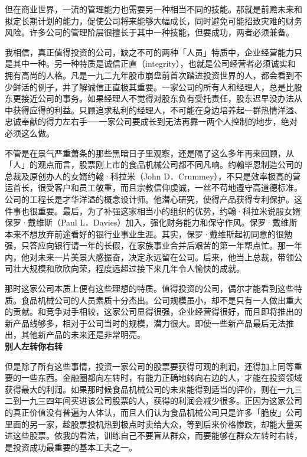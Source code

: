 \documentclass[UTF8,a4paper,zihao=-4,fontset = windows]{ctexart} %
\begin{document}
但在商业世界，一流的管理能力也需要另一种相当不同的技能。那就是前赡未来和拟定长期计划的能力，促使公司将来能够大幅成长，同时避免可能招致灾难的财务风险。许多公司的管理阶层很擅长于其中一种技能，但要成功，两者必须兼备。

我相信，真正值得投资的公司，缺之不可的两种「人员」特质中，企业经营能力只是其中一种。另一种特质是诚信正直（integrity），也就是公司经营者必须诚实和拥有高尚的人格。凡是一九二九年股市崩盘前首次踏进投资世界的人，都会看到不少鲜活的例子，并了解诚信正直极其重要。一家公司的所有人和经理人，总是比股东更接近公司的事务。如果经理人不觉得对股东负有受托责任，股东迟早没办法从中获得应得的利益。只顾追求私利的经理人，不可能在身边培养起一群热情洋溢、忠诚奉献的得力左右手──一家公司要成长到无法再靠一两个人控制的地步，绝对必须这么做。

不管是在景气严重萧条的那些黑暗日子里观察，还是隔了这么多年再来回顾，从「人」的观点而言，股票刚上市的食品机械公司都不同凡响。约翰毕恩制造公司的总裁及原创办人的女婿约翰·科拉米（John D．Crummey），不只是效率极高的营运首长，很受客户和员工敬重，而且宗教信仰虔诚，一丝不苟地遵守高道德标准。公司的工程长是才华洋溢的概念设计师。他潜心研究，使得产品获得专利保护。这件事也很重要。最后，为了补强这家相当小的组织的优势，约翰·科拉米说服女婿保罗·戴维斯（Paul L．Davies）加入，强化财务能力和保守作风。保罗·戴维斯本来不想放弃前途看好的银行业事业生涯。其实，保罗·戴维斯起初同意的很勉强，只答应向银行请一年的长假，在家族事业合并后艰苦的第一年帮点忙。那一年内，他对未来一片美景大感振奋，决定永远留在公司。后来，他当上总裁，带领公司壮大规模和欣欣向荣，程度远超过接下来几年令人愉快的成就。

那时这家公司本质上便有这些理想的特质。值得投资的公司，偶尔才能看到这些特质。食品机械公司的人员素质十分杰出。公司规模虽小，却不是只有一人做出重大的贡献。和竞争对手相较，这家公司显得很强，企业经营得很好，而且即将推出的新产品线够多，相对于公司当时的规模，潜力很大。即使一些新产品最后无法推出，其他新产品的未来还是非常明亮。
\\

\textbf{别人左转你右转}


但是除了所有这些事情，投资一家公司的股票要获得可观的利润，还得加上同等重要的一些东西。金融圈都向左转时，有能力正确地转向右边的人，才能在投资领域获得最大的利润。如果那时候食品机械公司的未来能得到适当的评价，则在一九三二到一九三四年间买进该公司股票的人，获得的利润会减少很多。正因为这家公司的真正价值没有普遍为人体认，而且人们认为食品机械公司只是许多「脆皮」公司里面的另一家，趁股票投机热到极点时卖给大众，等到后来价格惨跌，却能大量买进这些股票。依我的看法，训练自己不要盲从群众，而要能够在群众左转时右转，是投资成功最重要的基本工夫之一。
\end{document}
